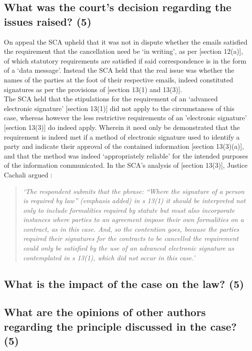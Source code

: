 \documentclass[11pt]{article}
\begin{document}
\subsection{What was the court's decision regarding the issues raised? (5)}
\label{sec:org287d0ea}

On appeal the SCA upheld that it was not in dispute whether the emails satisfied
the requirement that the cancellation need be `in writing', as per [section
12(a)]\cite{rsa02_elect_comm_trans_act}, of which statutory requirements are
satisfied if said correspondence is in the form of a `data message'. Instead the
SCA held that the real issue was whether the names of the parties at the foot of
their respective emails, indeed constituted signatures as per the provisions of
[section 13(1) and 13(3)]\cite{rsa02_elect_comm_trans_act}.\\

The SCA held that the stipulations for the requirement of an `advanced
electronic signature' [section 13(1)]\cite{rsa02_elect_comm_trans_act} did not
apply to the circumstances of this case, whereas however the less restrictive
requirements of an 'electronic signature' [section
13(3)]\cite{rsa02_elect_comm_trans_act} do indeed apply. Wherein it need only be
demonstrated that the requirement is indeed met if a method of electronic
signature used to identify a party and indicate their approval of the contained
information [section 13(3)(a)]\cite{rsa02_elect_comm_trans_act}, and that the method
was indeed `appropriately reliable' for the intended purposes of the information
communicated. In the SCA's analysis of [section 13(3)]\cite{rsa02_elect_comm_trans_act}, Justice
Cachali argued \cite{Cachalia15_spring_forest_v_wilberry}:
\begin{quote}
\textit{‘The respondent submits that the phrase: “Where the signature of a person is required by law” (emphasis added) in s 13(1) it should be interpreted not only to include formalities required by statute but must also incorporate instances where parties to an agreement impose their own formalities on a contract, as in this case. And, so the contention goes, because the parties required their signatures for the contracts to be cancelled the requirement could only be satisfied by the use of an advanced electronic signature as contemplated in s 13(1), which did not occur in this case.’}
\end{quote}
\subsection{What is the impact of the case on the law? (5)}
\label{sec:orgc00f50c}

\subsection{What are the opinions of other authors regarding the principle discussed in the case? (5)}
\label{sec:org294430b}

\printbibliography
\end{document}
